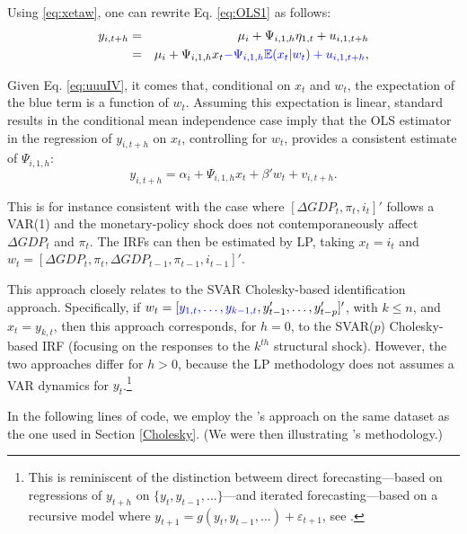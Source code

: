 \documentclass[
  11pt,
]{book}
\theoremstyle{definition}
\theoremstyle{definition}
\theoremstyle{definition}
\theoremstyle{definition}
\theoremstyle{remark}
\begin{document}
Using \eqref{eq:xetaw}, one can rewrite Eq. \eqref{eq:OLS1} as follows:
\begin{eqnarray*}
y_{i,t+h} &=& \mu_i + \Psi_{i,1,h}\eta_{1,t} + u_{i,1,t+h}\\
&=&  \mu_i + \Psi_{i,1,h}x_t  {\color{blue}-\Psi_{i,1,h}\mathbb{E}(x_t|w_t) + u_{i,1,t+h}},
\end{eqnarray*}

Given Eq. \eqref{eq:uuuIV}, it comes that, conditional on \(x_t\) and \(w_t\), the expectation of the blue term is a function of \(w_t\). Assuming this expectation is linear, standard results in the conditional mean independence case imply that the OLS estimator in the regression of \(y_{i,t+h}\) on \(x_t\), controlling for \(w_t\), provides a consistent estimate of \(\Psi_{i,1,h}\):
\begin{equation}
y_{i,t+h} = \alpha_i + \Psi_{i,1,h}x_t + \beta'w_t + v_{i,t+h}.
\end{equation}

This is for instance consistent with the case where \([\Delta GDP_t, \pi_t,i_t]'\) follows a VAR(1) and the monetary-policy shock does not contemporaneously affect \(\Delta GDP_t\) and \(\pi_t\). The IRFs can then be estimated by LP, taking \(x_t = i_t\) and \(w_t = [\Delta GDP_t,\pi_t,\Delta GDP_{t-1}, \pi_{t-1},i_{t-1}]'\).

This approach closely relates to the SVAR Cholesky-based identification approach. Specifically, if \(w_t = [{\color{blue}y_{1,t},\dots,y_{k-1,t}}, y_{t-1}',\dots,y_{t-p}']'\), with \(k\le n\), and \(x_t = y_{k,t}\), then this approach corresponds, for \(h=0\), to the SVAR(\(p\)) Cholesky-based IRF (focusing on the responses to the \(k^{th}\) structural shock). However, the two approaches differ for \(h>0\), because the LP methodology does not assumes a VAR dynamics for \(y_t\).\footnote{This is reminiscent of the distinction betweem direct forecasting---based on regressions of \(y_{t+h}\) on \(\{y_t,y_{t-1},\dots\}\)---and iterated forecasting---based on a recursive model where \(y_{t+1} = g(y_t,y_{t-1},\dots)+\varepsilon_{t+1}\), see \citet{Marcellino_et_al_2006}.}

In the following lines of code, we employ the \citet{Jorda_2005}'s approach on the same dataset as the one used in Section \ref{Cholesky}. (We were then illustrating \citet{Christiano_Eichenbaum_Evans_1996}'s methodology.)
\end{document}
